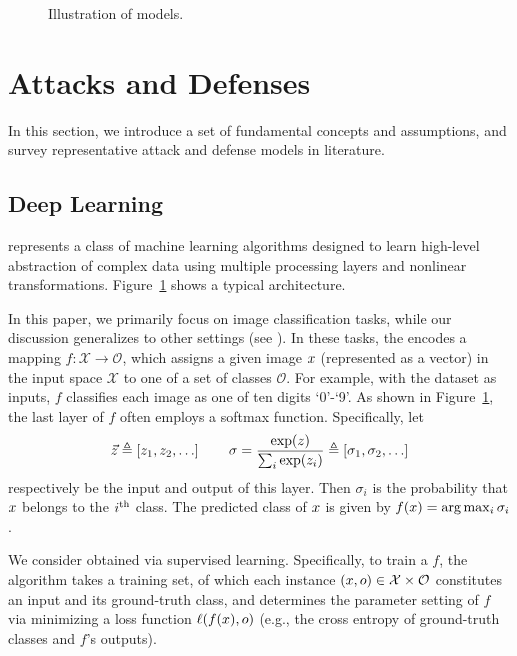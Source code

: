 


\begin{figure}
\centering
{}
\caption{Illustration of \dnn models. \label{fig:network}}
\end{figure}



\section{Attacks and Defenses}
\label{sec:background}

In this section, we introduce a set of fundamental concepts and assumptions, and survey representative attack and defense models in literature.

\subsection{Deep Learning}

\dl represents a class of machine learning algorithms designed to learn high-level abstraction of complex data using multiple processing layers and nonlinear transformations. Figure~\ref{fig:network} shows a typical \dnn architecture.

In this paper, we primarily focus on image classification tasks, while our discussion generalizes to other settings (see ). In these tasks, the \dnn encodes a mapping $f: \mathcal{X} \rightarrow \mathcal{O}$,  which assigns a given image $x$ (represented as a vector) in the input space ${\mathcal X}$ to one of a set of classes ${\mathcal O}$. For example, with the \mnist dataset as inputs, $f$ classifies each image as one of ten digits `0'-`9'. As shown in Figure~\ref{fig:network}, the last layer of $f$ often employs a softmax function. Specifically, let
\begin{displaymath}
 \vec{z}  \triangleq  \left[z_1, z_2, \ldots \right]\qquad \sigma  =  \frac{\exp(z)}{\sum_i \exp(z_i)} \triangleq \left[\sigma_1, \sigma_2, \ldots \right]
\end{displaymath}
 respectively be the input and output of this layer. Then $\sigma_i$ is the probability that $x$ belongs to the $i^{\rm th}$ class. The predicted class of $x$ is given by $f(x) = \arg\max_i \sigma_i$.

We consider \dnns obtained via supervised learning. Specifically, to train a \dnn $f$, the algorithm takes a training set, of which each instance $(x, o) \in {\mathcal X} \times {\mathcal O}$ constitutes an input and its ground-truth class, and determines the parameter setting of $f$ via minimizing a loss function $\ell(f(x), o)$ (e.g., the cross entropy of ground-truth classes and $f$'s outputs).

